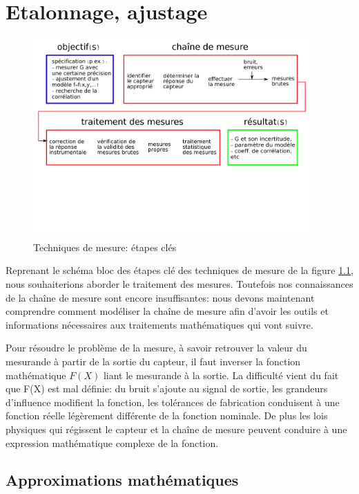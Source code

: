 \documentclass[main.tex]{subfiles}
\begin{document}
\chapter{Etalonnage, ajustage}
\label{chap:measurement-chain-modelisation}

\begin{figure}[h]
   \centering
   \includegraphics[width=0.96\textwidth]{assets/figures/flowChartTechMes.pdf} 
   \caption{Techniques de mesure: étapes clés}
   \label{fig:flowChartTechMes_chaine_de_mesure}
\end{figure}

Reprenant le schéma bloc des étapes clé des techniques de mesure de la figure \ref{fig:flowChartTechMes_chaine_de_mesure}, nous souhaiterions aborder le traitement des mesures. Toutefois nos connaissances de la chaîne de mesure sont encore insuffisantes: nous devons maintenant comprendre comment modéliser la chaîne de mesure afin d'avoir les outils et informations nécessaires aux traitements mathématiques qui vont suivre.

Pour résoudre le problème de la mesure, à savoir retrouver la valeur du mesurande à partir de la sortie du capteur, il faut inverser la fonction mathématique $F(X)$ liant le mesurande à la sortie. La difficulté vient du fait que F(X) est mal définie: du bruit s'ajoute au signal de sortie, les grandeurs d'influence modifient la fonction, les tolérances de fabrication conduisent à une fonction réelle légèrement différente de la fonction nominale. De plus les lois physiques qui régissent le capteur et la chaîne de mesure peuvent conduire à une expression mathématique complexe de la fonction.

\section{Approximations mathématiques}
\end{document}
